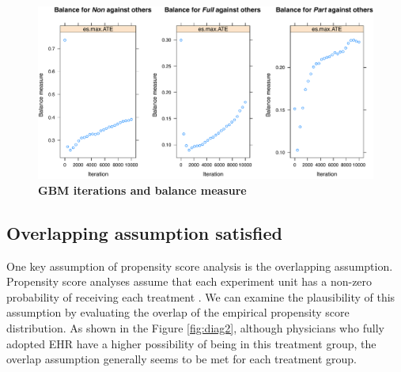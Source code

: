 \documentclass[12pt]{report}
\begin{document}
\begin{figure}[!htb]
\begin{center}
\includegraphics[width=\textwidth]{psdiag1.pdf}
\caption{{\bf GBM iterations and balance measure}}
\label{fig:diag1}
\end{center}
\end{figure}

\subsection{Overlapping assumption satisfied}
One key assumption of propensity score analysis is the overlapping assumption. Propensity score analyses assume that each experiment unit has a non-zero probability of receiving each treatment \citep{mnps2015}. We can examine the plausibility of this assumption by evaluating the overlap of the empirical propensity score distribution. As shown in the Figure \ref{fig:diag2}, although physicians who fully adopted EHR have a higher possibility of being in this treatment group, the overlap assumption generally seems to be met for each treatment group. 
\end{document}
